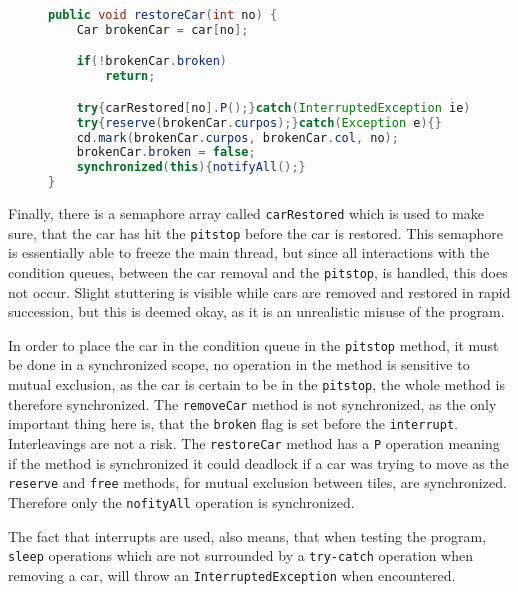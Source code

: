\begin{figure}[H]
\begin{lstlisting}[language=java, caption=restoreCar method, label=src:restoreCar]
public void restoreCar(int no) { 
    Car brokenCar = car[no];

    if(!brokenCar.broken)
        return;

    try{carRestored[no].P();}catch(InterruptedException ie){}
    try{reserve(brokenCar.curpos);}catch(Exception e){}
    cd.mark(brokenCar.curpos, brokenCar.col, no);
    brokenCar.broken = false;
    synchronized(this){notifyAll();}
}
\end{lstlisting}
\end{figure}

Finally, there is a semaphore array called \texttt{carRestored} which is used to make sure, that the car has hit the \texttt{pitstop} before the car is restored. This semaphore is essentially able to freeze the main thread, but since all interactions with the condition queues, between the car removal and the \texttt{pitstop}, is handled, this does not occur. Slight stuttering is visible while cars are removed and restored in rapid succession, but this is deemed okay, as it is an unrealistic misuse of the program.

In order to place the car in the condition queue in the \texttt{pitstop} method, it must be done in a synchronized scope, no operation in the method is sensitive to mutual exclusion, as the car is certain to be in the \texttt{pitstop}, the whole method is therefore synchronized. The \texttt{removeCar} method is not synchronized, as the only important thing here is, that the \texttt{broken} flag is set before the \texttt{interrupt}. Interleavings are not a risk. The \texttt{restoreCar} method has a \texttt{P} operation meaning if the method is synchronized it could deadlock if a car was trying to move as the \texttt{reserve} and \texttt{free} methods, for mutual exclusion between tiles, are synchronized. Therefore only the \texttt{nofityAll} operation is synchronized.
 

The fact that interrupts are used, also means, that when testing the program, \texttt{sleep} operations which are not surrounded by a \texttt{try-catch} operation when removing a car, will throw an \texttt{InterruptedException} when encountered.